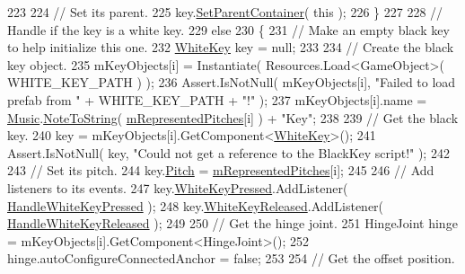 \begin{DoxyCodeInclude}
223 
224                 \textcolor{comment}{// Set its parent.}
225                 key.\hyperlink{group___black_key_pub_func_ga49d807a46e36ba19211be329db1cbd2e}{SetParentContainer}( \textcolor{keyword}{this} );
226             \}
227 
228             \textcolor{comment}{// Handle if the key is a white key.}
229             \textcolor{keywordflow}{else}
230             \{
231                 \textcolor{comment}{// Make an empty black key to help initialize this one.}
232                 \hyperlink{class_white_key}{WhiteKey} key = null;
233 
234                 \textcolor{comment}{// Create the black key object.}
235                 mKeyObjects[i] = Instantiate( Resources.Load<GameObject>( WHITE\_KEY\_PATH ) );
236                 Assert.IsNotNull( mKeyObjects[i], \textcolor{stringliteral}{"Failed to load prefab from "} + WHITE\_KEY\_PATH + \textcolor{stringliteral}{"!"} );
237                 mKeyObjects[i].name = \hyperlink{class_music}{Music}.\hyperlink{group___music_stat_func_ga85a22c905d56d4c5f4e62159bfecee8c}{NoteToString}( 
      \hyperlink{group___key_contain_priv_var_ga103945a6efe3469191e5253d13fec5be}{mRepresentedPitches}[i] ) + \textcolor{stringliteral}{"Key"};
238 
239                 \textcolor{comment}{// Get the black key.}
240                 key = mKeyObjects[i].GetComponent<\hyperlink{class_white_key}{WhiteKey}>();
241                 Assert.IsNotNull( key, \textcolor{stringliteral}{"Could not get a reference to the BlackKey script!"} );
242 
243                 \textcolor{comment}{// Set its pitch.}
244                 key.\hyperlink{group___white_key_pub_var_ga1ddd98b85ba069defc7cf47d25f625f4}{Pitch} = \hyperlink{group___key_contain_priv_var_ga103945a6efe3469191e5253d13fec5be}{mRepresentedPitches}[i];
245 
246                 \textcolor{comment}{// Add listeners to its events.}
247                 key.\hyperlink{group___white_key_events_gab84691fc1e9f7b62884589d1813433e2}{WhiteKeyPressed}.AddListener( 
      \hyperlink{group___key_contain_handlers_ga4e2c5e8be389a7514429910e7d61f028}{HandleWhiteKeyPressed} );
248                 key.\hyperlink{group___white_key_events_ga180e88cd7ab95af43231f53469e87830}{WhiteKeyReleased}.AddListener( 
      \hyperlink{group___key_contain_handlers_ga5b98b0105300225fd79638525ad3cb3c}{HandleWhiteKeyReleased} );
249 
250                 \textcolor{comment}{// Get the hinge joint.}
251                 HingeJoint hinge = mKeyObjects[i].GetComponent<HingeJoint>();
252                 hinge.autoConfigureConnectedAnchor = \textcolor{keyword}{false};
253 
254                 \textcolor{comment}{// Get the offset position.}

\end{DoxyCodeInclude}
